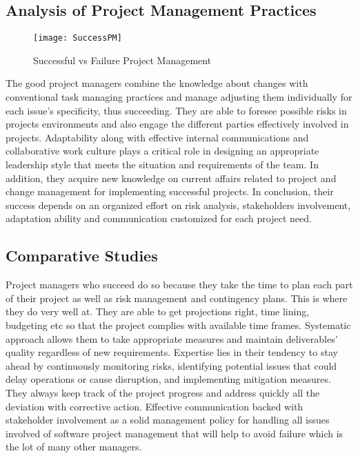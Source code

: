\documentclass{article}
\begin{document}
\subsection{Analysis of Project Management Practices}
\begin{figure}[htp]
    \centering
    \texttt{[image: SuccessPM]}
    \caption{Successful vs Failure Project Management}
    \label{fig:SuccessPM}
\end{figure}
The good project managers combine the knowledge about changes with conventional task managing practices and manage adjusting them individually for each issue’s specificity, thus succeeding. They are able to foresee possible risks in projects environments and also engage the different parties effectively involved in projects. Adaptability along with effective internal communications and collaborative work culture plays a critical role in designing an appropriate leadership style that meets the situation and requirements of the team. In addition, they acquire new knowledge on current affairs related to project and change management for implementing successful projects. In conclusion, their success depends on an organized effort on risk analysis, stakeholders involvement, adaptation ability and communication customized for each project need.\cite{pollack2016project}

\subsection{Comparative Studies}
Project managers who succeed do so because they take the time to plan each part of their project as well as risk management and contingency plans. This is where they do very well at. They are able to get projections right, time lining, budgeting etc so that the project complies with available time frames. Systematic approach allows them to take appropriate measures and maintain deliverables’ quality regardless of new requirements. Expertise lies in their tendency to stay ahead by continuously monitoring risks, identifying potential issues that could delay operations or cause disruption, and implementing mitigation measures. They always keep track of the project progress and address quickly all the deviation with corrective action. Effective communication backed with stakeholder involvement as a solid management policy for handling all issues involved of software project management that will help to avoid failure which is the lot of many other managers.\cite{jones2004software}
\end{document}
